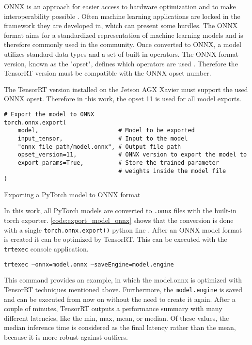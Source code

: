 \vspace{0.8cm}

\ac{ONNX} is an approach for easier access to hardware optimization and to make interoperability possible \cite{onnx_docu}.
Often machine learning applications are locked in the framework they are developed in, which can present some hurdles.
The \ac{ONNX} format aims for a standardized representation of machine learning models and is therefore commonly used in the community.
Once converted to ONNX, a model utilizes standard data types and a set of built-in operators.
The \ac{ONNX} format version, known as the "opset", defines which operators are used \cite{onnx_docu}.
Therefore the TensorRT version must be compatible with the \ac{ONNX} opset number.

\vspace{0.8cm}

The TensorRT version installed on the Jetson AGX Xavier must support the used \ac{ONNX} opset.
Therefore in this work, the opset 11 is used for all model exports.

\begin{listing}[H]
\begin{verbatim}
# Export the model to ONNX
torch.onnx.export(
    model,                       # Model to be exported
    input_tensor,                # Input to the model
    "onnx_file_path/model.onnx", # Output file path
    opset_version=11,            # ONNX version to export the model to
    export_params=True,          # Store the trained parameter
                                 # weights inside the model file
)
\end{verbatim}
\caption{Exporting a PyTorch model to \ac{ONNX} format}
\label{code:export_model_onnx}
\end{listing}

In this work, all PyTorch models are converted to \texttt{.onnx} files with the built-in torch exporter.
\autoref{code:export_model_onnx} shows that the conversion is done with a single \texttt{torch.onnx.export()} python line \cite{pytorch_onnx_exporter_docu}.
After an \ac{ONNX} model format is created it can be optimized by TensorRT.
This can be executed with the \texttt{trtexec} console application.

\vspace{0.5cm}
\begin{center}
    \texttt{trtexec --onnx=model.onnx --saveEngine=model.engine}
\end{center}
\vspace{0.5cm}

This command provides an example, in which the model.onnx is optimized with TensorRT techniques mentioned above.
Furthermore, the \texttt{model.engine} is saved and can be executed from now on without the need to create it again.
After a couple of minutes, TensorRT outputs a performance summary with many different latencies, like the min, max, mean, or median.
Of these values, the median inference time is considered as the final latency rather than the mean, because it is more robust against outliers.